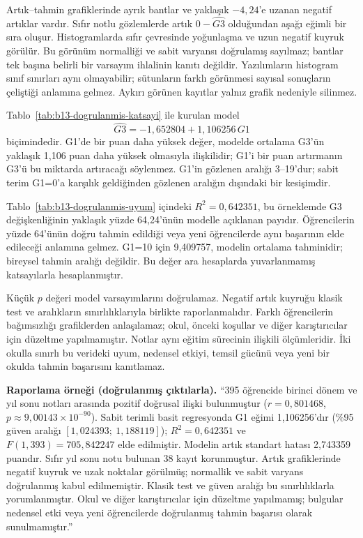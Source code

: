 Artık--tahmin grafiklerinde ayrık bantlar ve yaklaşık $-4{,}24$'e
uzanan negatif artıklar vardır. Sıfır notlu gözlemlerde
artık $0-\widehat{G3}$ olduğundan aşağı eğimli bir sıra oluşur.
Histogramlarda sıfır çevresinde yoğunlaşma ve uzun negatif kuyruk
görülür. Bu görünüm normalliği ve sabit varyansı doğrulamış sayılmaz;
bantlar tek başına belirli bir varsayım ihlalinin kanıtı değildir.
Yazılımların histogram sınıf sınırları aynı olmayabilir; sütunların
farklı görünmesi sayısal sonuçların çeliştiği anlamına gelmez.
Aykırı görünen kayıtlar yalnız grafik nedeniyle silinmez.

\begin{outputguidebox}
Tablo~\ref{tab:b13-dogrulanmis-katsayi} ile kurulan model
\[
\widehat{G3}=-1{,}652804+1{,}106256\,G1
\]
biçimindedir. G1'de bir puan daha yüksek değer, modelde ortalama
G3'ün yaklaşık 1,106 puan daha yüksek olmasıyla ilişkilidir;
G1'i bir puan artırmanın G3'ü bu miktarda artıracağı söylenmez.
G1'in gözlenen aralığı 3--19'dur; sabit terim G1=0'a karşılık
geldiğinden gözlenen aralığın dışındaki bir kesişimdir.

Tablo~\ref{tab:b13-dogrulanmis-uyum} içindeki $R^2=0{,}642351$,
bu örneklemde G3 değişkenliğinin yaklaşık yüzde 64,24'ünün modelle
açıklanan payıdır. Öğrencilerin yüzde 64'ünün doğru tahmin edildiği
veya yeni öğrencilerde aynı başarının elde edileceği anlamına gelmez.
G1=10 için 9,409757, modelin ortalama tahminidir; bireysel tahmin
aralığı değildir. Bu değer ara hesaplarda yuvarlanmamış katsayılarla
hesaplanmıştır.

Küçük $p$ değeri model varsayımlarını doğrulamaz. Negatif artık
kuyruğu klasik test ve aralıkların sınırlılıklarıyla birlikte
raporlanmalıdır. Farklı öğrencilerin bağımsızlığı grafiklerden
anlaşılamaz; okul, önceki koşullar ve diğer karıştırıcılar için
düzeltme yapılmamıştır. Notlar aynı eğitim sürecinin ilişkili
ölçümleridir. İki okulla sınırlı bu verideki uyum, nedensel etkiyi,
temsil gücünü veya yeni bir okulda tahmin başarısını kanıtlamaz.
\end{outputguidebox}

\textbf{Raporlama örneği (doğrulanmış çıktılarla).}
``395 öğrencide birinci dönem ve yıl sonu notları arasında pozitif
doğrusal ilişki bulunmuştur ($r=0{,}801468$,
$p\approx9{,}00143\times10^{-90}$). Sabit terimli basit regresyonda
G1 eğimi 1,106256'dır (\%95 güven aralığı
$[1{,}024393;\ 1{,}188119]$); $R^2=0{,}642351$ ve
$F(1,393)=705{,}842247$ elde edilmiştir. Modelin artık standart
hatası 2,743359 puandır. Sıfır yıl sonu notu bulunan 38 kayıt
korunmuştur. Artık grafiklerinde negatif kuyruk ve uzak noktalar
görülmüş; normallik ve sabit varyans doğrulanmış kabul edilmemiştir.
Klasik test ve güven aralığı bu sınırlılıklarla yorumlanmıştır.
Okul ve diğer karıştırıcılar için düzeltme yapılmamış; bulgular
nedensel etki veya yeni öğrencilerde doğrulanmış tahmin başarısı
olarak sunulmamıştır.''

